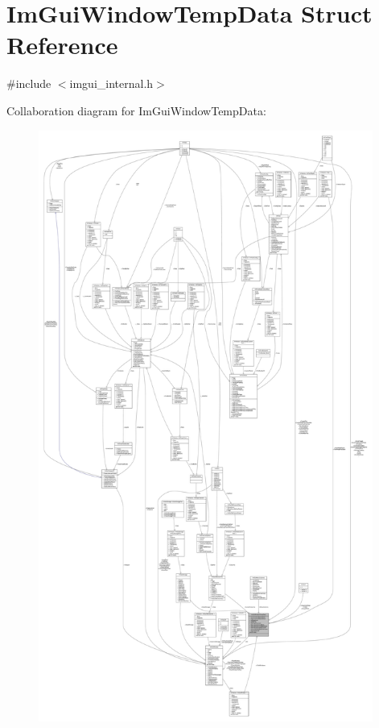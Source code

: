 \hypertarget{structImGuiWindowTempData}{}\section{Im\+Gui\+Window\+Temp\+Data Struct Reference}
\label{structImGuiWindowTempData}


{\ttfamily \#include $<$imgui\+\_\+internal.\+h$>$}



Collaboration diagram for Im\+Gui\+Window\+Temp\+Data\+:
\nopagebreak
\begin{figure}[H]
\begin{center}
\leavevmode
\includegraphics[height=550pt]{structImGuiWindowTempData__coll__graph}
\end{center}
\end{figure}
